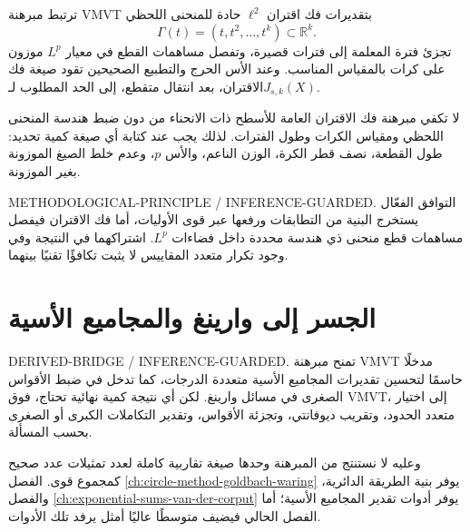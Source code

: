 \begin{theorem}
\label{thm:ch25-decoupling-bridge}
ترتبط مبرهنة VMVT بتقديرات فك اقتران \(\ell^2\) حادة للمنحنى اللحظي
\[
\Gamma(t)=(t,t^2,\ldots,t^k)\subset\mathbb R^k.
\]
تجزئ فترة المعلمة إلى فترات قصيرة، وتفصل مساهمات القطع في معيار \(L^p\) موزون على كرات بالمقياس المناسب. وعند الأس الحرج والتطبيع الصحيحين تقود صيغة فك الاقتران، بعد انتقال متقطع، إلى الحد المطلوب لـ\(J_{s,k}(X)\).
\end{theorem}

لا تكفي مبرهنة فك الاقتران العامة للأسطح ذات الانحناء من دون ضبط هندسة المنحنى اللحظي ومقياس الكرات وطول الفترات. لذلك يجب عند كتابة أي صيغة كمية تحديد: طول القطعة، نصف قطر الكرة، الوزن الناعم، والأس \(p\)، وعدم خلط الصيغ الموزونة بغير الموزونة.

\begin{remark}
\label{rem:ch25-independent-methods}
\noindent\textenglish{METHODOLOGICAL-PRINCIPLE / INFERENCE-GUARDED}.
التوافق الفعّال يستخرج البنية من التطابقات ورفعها عبر قوى الأوليات، أما فك الاقتران فيفصل مساهمات قطع منحنى ذي هندسة محددة داخل فضاءات \(L^p\). اشتراكهما في النتيجة وفي وجود تكرار متعدد المقاييس لا يثبت تكافؤًا تقنيًا بينهما.
\end{remark}

\section{الجسر إلى وارينغ والمجاميع الأسية}

\begin{corollary}
\label{cor:ch25-waring-exponential-bridge}
\noindent\textenglish{DERIVED-BRIDGE / INFERENCE-GUARDED}.
تمنح مبرهنة VMVT مدخلًا حاسمًا لتحسين تقديرات المجاميع الأسية متعددة الدرجات، كما تدخل في ضبط الأقواس الصغرى في مسائل وارينغ. لكن أي نتيجة كمية نهائية تحتاج، فوق VMVT، إلى اختيار متعدد الحدود، وتقريب ديوفانتي، وتجزئة الأقواس، وتقدير التكاملات الكبرى أو الصغرى بحسب المسألة.
\end{corollary}

وعليه لا نستنتج من المبرهنة وحدها صيغة تقاربية كاملة لعدد تمثيلات عدد صحيح كمجموع قوى. الفصل \ref{ch:circle-method-goldbach-waring} يوفر بنية الطريقة الدائرية، والفصل \ref{ch:exponential-sums-van-der-corput} يوفر أدوات تقدير المجاميع الأسية؛ أما الفصل الحالي فيضيف متوسطًا عاليًا أمثل يرفد تلك الأدوات.

